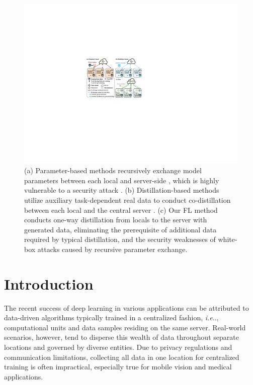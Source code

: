 \documentclass[letterpaper]{article} %
\makeatletter
\DeclareRobustCommand\onedot{\futurelet\@let@token\@onedot}
\def\@onedot{\ifx\@let@token.\else.\null\fi\xspace}
\def\ie{\emph{i.e}\onedot} \def\Ie{\emph{I.e}\onedot}
\makeatother
\begin{document}
\begin{figure}[h]
\centering
\includegraphics[width=\linewidth]{fig/fig1.pdf}
\caption{ (a) Parameter-based methods recursively exchange model parameters between each local and server-side \cite{mcmahan2017communication,li2018federated, karimireddy2019scaffold}, which is highly vulnerable to a security attack \cite{zhu2019deep}.
(b) Distillation-based methods utilize auxiliary task-dependent real data to conduct co-distillation between each local and the central server \cite{li2019fedmd, gong2022preserving}.
(c) Our FL method conducts one-way distillation from locals to the server with generated data, eliminating the prerequisite of additional data required by typical distillation, and the security weaknesses of white-box attacks caused by recursive parameter exchange.
}
\label{fig1}
\end{figure}

\section{Introduction}
\label{sec:intro}
The recent success of deep learning in various applications can be attributed to data-driven algorithms typically trained in a centralized fashion, \ie, computational units and data samples residing on the same server. Real-world scenarios, however, tend to disperse this wealth of data throughout separate locations and governed by diverse entities. Due to privacy regulations and communication limitations, collecting all data in one location for centralized training is often impractical, especially true for mobile vision and medical applications.
\end{document}
